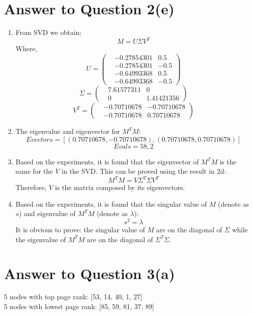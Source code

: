 \documentclass[11pt]{article}
\begin{document}
\section*{Answer to Question 2(e)}
\begin{enumerate}
\item
From SVD we obtain:
\begin{equation*}
    M = U\Sigma V^T
\end{equation*}
Where,
$$
U = 
\begin{pmatrix}
    &-0.27854301 & 0.5\\
    &-0.27854301 & -0.5\\
    &-0.64993368 & 0.5\\
    &-0.64993368 & -0.5
\end{pmatrix}
$$
$$
\Sigma = 
\begin{pmatrix}
    &7.61577311 & 0\\
    &0 & 1.41421356
\end{pmatrix}
$$
$$
V^T = 
\begin{pmatrix}
    & -0.70710678 & -0.70710678\\
    & -0.70710678 & 0.70710678
\end{pmatrix}
$$
\item
The eigenvalue and eigenvector for $M^TM$:
$$
Evectors = [(0.70710678, -0.70710678), (0.70710678, 0.70710678)]
$$
$$
    Evals = 58, 2
$$

\item
Based on the experiments, it is found that the eigenvector of $M^TM$ is the same for the $V$ in the SVD.
This can be proved using the result in 2d:
$$
    M^TM = V\Sigma^T\Sigma V^T
$$
Therefore, $V$ is the matrix composed by its eigenvectors.

\item
Based on the experiments, it is found that the singular value of $M$ (denote as $s$) and eigenvalue of $M^TM$ (denote as $\lambda$):
\begin{equation}
    s^2 = \lambda
\end{equation}
It is obvious to prove: the singular value of $M$ are on the diagonal of $\Sigma$ while the eigenvalue of $M^TM$ are on the diagonal of $\Sigma^T\Sigma$.

\end{enumerate}

\pagebreak[4]
\section*{Answer to Question 3(a)}
5 nodes with top page rank: [53, 14, 40, 1, 27]\\
5 nodes with lowest page rank: [85, 59, 81, 37, 89]
\end{document}
